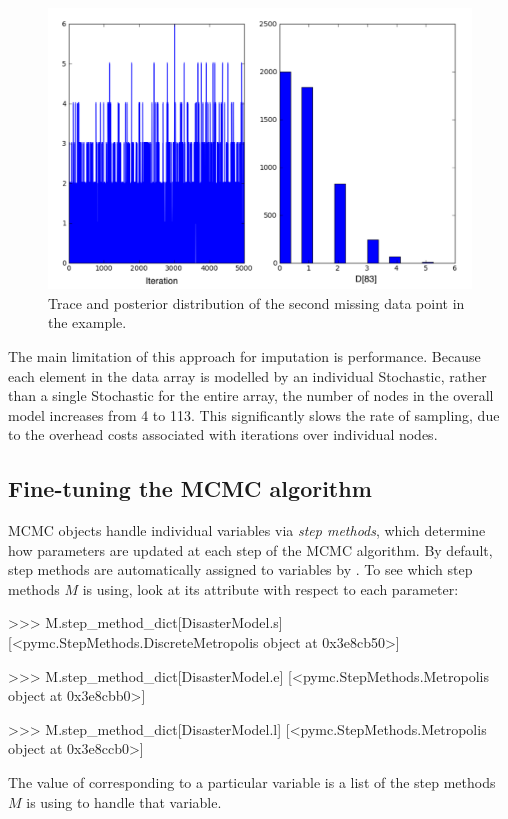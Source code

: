 \documentclass[]{jss}
\begin{document}
\begin{figure}[ht]
\begin{center}
\includegraphics[width=15cm]{missing.pdf}
\caption{Trace and posterior distribution of the second missing data point in the example.}
\label{fig:missing}
\end{center}
\end{figure}


The main limitation of this approach for imputation is performance. Because each
element in the data array is modelled by an individual Stochastic, rather than a
single Stochastic for the entire array, the number of nodes in the overall model
increases from 4 to 113. This significantly slows the rate of sampling, due to
the overhead costs associated with iterations over individual nodes.


\subsection{Fine-tuning the MCMC algorithm}

MCMC objects handle individual variables via \emph{step methods}, which determine how parameters are updated at each step of the MCMC algorithm. By default, step methods are automatically assigned to variables by . To see which step methods $M$ is using, look at its  attribute with respect to each parameter:
\begin{CodeInput}
>>> M.step_method_dict[DisasterModel.s]
[<pymc.StepMethods.DiscreteMetropolis object at 0x3e8cb50>]

>>> M.step_method_dict[DisasterModel.e]
[<pymc.StepMethods.Metropolis object at 0x3e8cbb0>]

>>> M.step_method_dict[DisasterModel.l]
[<pymc.StepMethods.Metropolis object at 0x3e8ccb0>]
\end{CodeInput}
The value of  corresponding to a particular variable is a list of the step methods $M$ is using to handle that variable.
\end{document}
